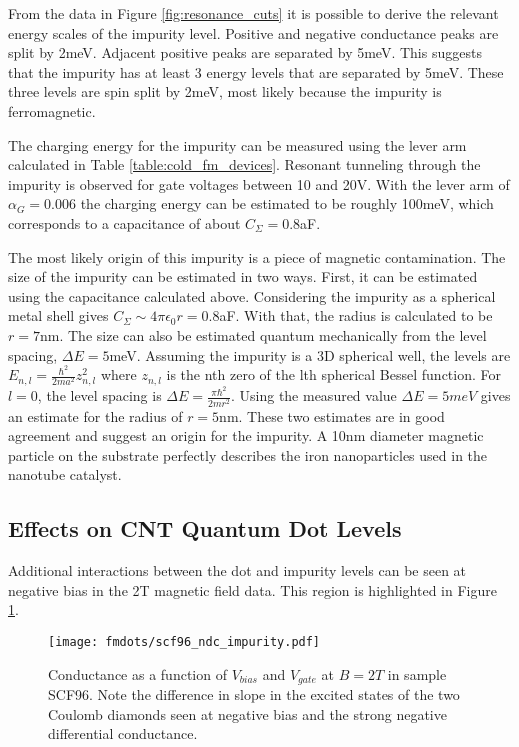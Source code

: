 From the data in Figure \ref{fig:resonance_cuts} it is possible to derive the relevant energy scales of the impurity level. Positive and negative conductance peaks are split by 2meV. Adjacent positive peaks are separated by 5meV. This suggests that the impurity has at least 3 energy levels that are separated by 5meV. These three levels are spin split by 2meV, most likely because the impurity is ferromagnetic.

The charging energy for the impurity can be measured using the lever arm calculated in Table \ref{table:cold_fm_devices}. Resonant tunneling through the impurity is observed for gate voltages between 10 and 20V. With the lever arm of $\alpha_G = 0.006$ the charging energy can be estimated to be roughly 100meV, which corresponds to a capacitance of about $C_{\Sigma} = 0.8$aF. 

The most likely origin of this impurity is a piece of magnetic contamination. The size of the impurity can be estimated in two ways. First, it can be estimated using the capacitance calculated above. Considering the impurity as a spherical metal shell gives $C_{\Sigma} \sim 4\pi \epsilon_0 r = 0.8$aF. With that, the radius is calculated to be $r = 7$nm. The size can also be estimated quantum mechanically from the level spacing, $\Delta E = 5$meV. Assuming the impurity is a 3D spherical well, the levels are $E_{n,l} = \frac{\hbar^2}{2ma^2}z_{n,l}^2$ where $z_{n,l}$ is the nth zero of the lth spherical Bessel function. For $l=0$, the level spacing is $\Delta E = \frac{\pi \hbar^2}{2mr^2}$. Using the measured value $\Delta E = 5meV$ gives an estimate for the radius of $r = 5$nm. These two estimates are in good agreement and suggest an origin for the impurity. A 10nm diameter magnetic particle on the substrate perfectly describes the iron nanoparticles used in the nanotube catalyst.

\subsection{Effects on CNT Quantum Dot Levels}

Additional interactions between the dot and impurity levels can be seen at negative bias in the 2T magnetic field data. This region is highlighted in Figure \ref{fig:scf96_ndc_impurity}.

\begin{figure}
    \centering
    \texttt{[image: fmdots/scf96\_ndc\_impurity.pdf]}
    \caption{Conductance as a function of $V_{bias}$ and $V_{gate}$ at $B=2T$ in sample SCF96. Note the difference in slope in the excited states of the two Coulomb diamonds seen at negative bias and the strong negative differential conductance.}
    \label{fig:scf96_ndc_impurity}
\end{figure}

